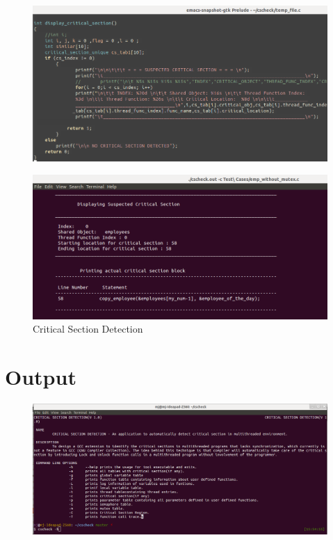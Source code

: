 \begin{figure}[H]
\centering
\includegraphics[scale=0.4]{Snaps/util_18.png}
\label{<<Label>>}
\end{figure}

\begin{figure}[H]
\centering
\includegraphics[scale=0.4]{Snaps/util_15-18_out1.png}
\caption{ Critical Section Detection }
\label{<<Label>>}
\end{figure}


\section{Output}
\begin{figure}[H]
\centering
\includegraphics[scale=0.4]{Snaps/help.png}
\label{<<Label>>}
\end{figure}


